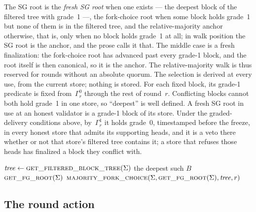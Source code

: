\documentclass{article}
\theoremstyle{plain}
\theoremstyle{definition}
\theoremstyle{remark}
\newcommand{\fname}[1]{\text{\textsc{#1}}}
\begin{document}
The SG root is the \emph{fresh SG root} when one exists --- the deepest
block of the filtered tree with grade~1 ---, the fork-choice root when
some block holds grade~1 but none of them is in the filtered tree, and the
relative-majority anchor otherwise, that is, only when no block holds
grade~1 at all; in walk position the SG root is the anchor, and the prose
calls it that.  The middle case is a fresh finalization: the fork-choice
root has advanced past every grade-1 block, and the root itself is then
canonical, so it is the anchor.  The relative-majority walk is thus
reserved for rounds without an absolute quorum.  The selection is derived
at every use, from the current store; nothing is stored.  For each fixed
block, its grade-1 predicate is fixed from~$\Gamma_r^0$ through the rest
of round~$r$.
Conflicting blocks cannot both hold grade~1 in one store, so ``deepest''
is well defined.  A fresh SG root in use at an honest validator is a
grade-1 block of its store.  Under the graded-delivery
conditions above, by~$\Gamma_r^1$ it holds grade~0, timestamped before
the freeze, in every honest store that admits its supporting heads, and
it is a veto there whether or not that store's filtered tree contains it;
a store that refuses those heads has finalized a block they conflict
with.

\label{alg:fresh-anchor}
\nopagebreak
{\footnotesize
\begin{algorithmic}[1]
  \State $\mathit{tree}\gets\Call{get\_filtered\_block\_tree}{\Sigma}$
    \State \Return the deepest such $B$
    \State \Return $\fname{get\_fg\_root}(\Sigma)$
  \EndIf
  \State \Return $\Call{majority\_fork\_choice}{\Sigma,
    \fname{get\_fg\_root}(\Sigma),\mathit{tree},r}$
\EndFunction
\end{algorithmic}
}

\subsection{The round action}\label{sec:healing-action}
\end{document}

